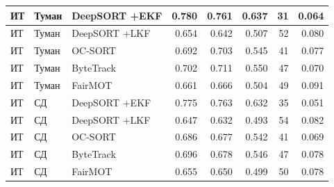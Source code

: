 \begin{longtable}{|p{2.42cm}|p{1.8cm}|p{2.4cm}|r|r|r|r|r|}
       ИТ     &      Туман & DeepSORT +EKF & 0.780 & 0.761 & 0.637 &   31 & 0.064  \\ \hline
       ИТ     &      Туман & DeepSORT +LKF & 0.654 & 0.642 & 0.507 &   52 & 0.080  \\ \hline
       ИТ     &      Туман &      OC-SORT & 0.692 & 0.703 & 0.545 &   41 & 0.077  \\ \hline
       ИТ     &      Туман &    ByteTrack & 0.702 & 0.711 & 0.550 &   47 & 0.070  \\ \hline
       ИТ     &      Туман &      FairMOT & 0.661 & 0.666 & 0.504 &   49 & 0.091  \\ \hline
       ИТ     &      СД & DeepSORT +EKF & 0.775 & 0.763 & 0.632 &   35 & 0.051  \\ \hline
       ИТ     &      СД & DeepSORT +LKF & 0.647 & 0.632 & 0.493 &   54 & 0.082  \\ \hline
       ИТ     &      СД &      OC-SORT & 0.686 & 0.677 & 0.542 &   41 & 0.069  \\ \hline
       ИТ     &      СД &    ByteTrack & 0.696 & 0.678 & 0.546 &   47 & 0.078  \\ \hline
       ИТ     &      СД &      FairMOT & 0.655 & 0.650 & 0.499 &   50 & 0.078  \\ \hline
\end{longtable}
